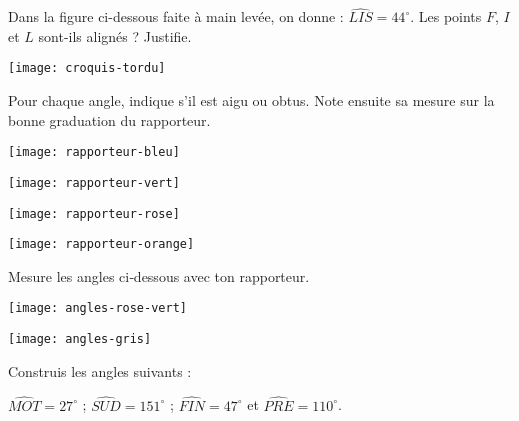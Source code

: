 \begin{exercice}[Alignés ?]
Dans la figure ci-dessous faite à main levée, on donne : $\widehat{LIS}= 44^\circ$.
Les points $F$, $I$ et $L$ sont-ils alignés ? Justifie.
 \begin{center} \texttt{[image: croquis-tordu]} \end{center}
\end{exercice} 



\begin{exercice}
Pour chaque angle, indique s'il est aigu ou obtus. Note ensuite sa mesure sur la bonne graduation du rapporteur.
\begin{colenumerate}{2}
 \item  
 
 \texttt{[image: rapporteur-bleu]}
 \item 
 
 \texttt{[image: rapporteur-vert]}
 \item 

 \texttt{[image: rapporteur-rose]}
 \item 
 
 \texttt{[image: rapporteur-orange]}
 
 \end{colenumerate}
\end{exercice} 

\begin{exercice}
Mesure les angles ci‑dessous avec ton rapporteur.
 \begin{center} \texttt{[image: angles-rose-vert]} \end{center}
 
 \begin{center} \texttt{[image: angles-gris]} \end{center}
\end{exercice} 




\newpage





\begin{exercice}
Construis les angles suivants :

$\widehat{MOT} = 27^\circ$ ; $\widehat{SUD} = 151^\circ$ ; $\widehat{FIN} = 47^\circ$ et $\widehat{PRE} = 110^\circ$.
\end{exercice} 


